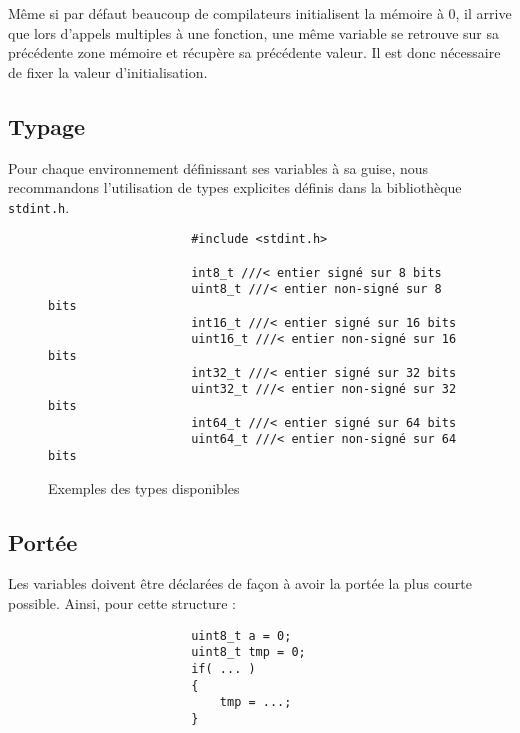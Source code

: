 			Même si par défaut beaucoup de compilateurs initialisent la mémoire à 0, il arrive que lors d'appels multiples à une fonction, une même variable se retrouve sur sa précédente zone mémoire et récupère sa précédente valeur. Il est donc nécessaire de fixer la valeur d'initialisation.

		\subsection{Typage}
			Pour chaque environnement définissant ses variables à sa guise, nous recommandons l'utilisation de types explicites définis dans la bibliothèque \verb+stdint.h+.

			\begin{figure}[H]
				\begin{changemargin}{-2.5cm}{-2.5cm}
				\begin{tcolorbox}
				\begin{verbatim}
					#include <stdint.h>

					int8_t ///< entier signé sur 8 bits
					uint8_t ///< entier non-signé sur 8 bits
					int16_t ///< entier signé sur 16 bits
					uint16_t ///< entier non-signé sur 16 bits
					int32_t ///< entier signé sur 32 bits
					uint32_t ///< entier non-signé sur 32 bits
					int64_t ///< entier signé sur 64 bits
					uint64_t ///< entier non-signé sur 64 bits
				\end{verbatim}
				\end{tcolorbox}
				\end{changemargin}
				\caption{Exemples des types disponibles}
			\end{figure}

		\subsection{Portée}
			Les variables doivent être déclarées de façon à avoir la portée la plus courte possible. Ainsi, pour cette structure :

			\begin{figure}[H]
				\begin{changemargin}{-2.5cm}{-2.5cm}
				\begin{tcolorbox}
				\begin{verbatim}
					uint8_t a = 0;
					uint8_t tmp = 0;
					if( ... )
					{
						tmp = ...;
					}
				\end{verbatim}
				\end{tcolorbox}
				\end{changemargin}
			\end{figure}

